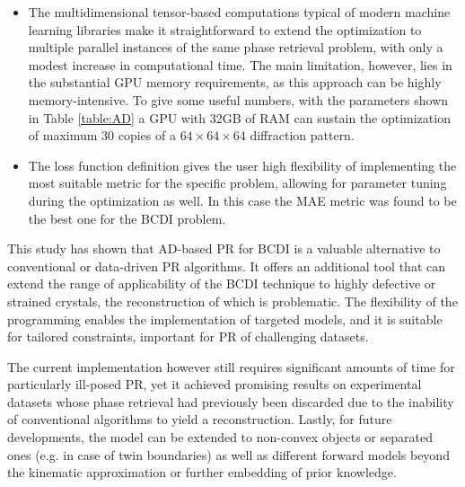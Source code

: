 \begin{itemize}
  \item The multidimensional tensor-based computations typical of modern machine learning libraries make it straightforward 
  to extend the optimization to multiple parallel instances of the same phase retrieval problem, with only a modest 
  increase in computational time. The main limitation, however, lies in the substantial GPU memory requirements, as 
  this approach can be highly memory-intensive. To give some useful numbers, with the parameters shown in Table \ref{table:AD} 
  a GPU with 32GB of RAM can sustain the optimization of maximum 30 copies of a $64\times 64\times 64$ diffraction pattern. 

  \item The loss function definition gives the user high flexibility of implementing the most suitable metric for the 
  specific problem, allowing for parameter tuning during the optimization as well. In this case the MAE metric was found to be the 
  best one for the BCDI problem.  
  
\end{itemize}

This study has shown that AD-based PR for BCDI is a valuable alternative to conventional or data-driven PR algorithms. 
It offers an additional tool that can extend the range of applicability of the BCDI technique to highly defective or strained 
crystals, the reconstruction of which is problematic. The flexibility of the programming enables the implementation of 
targeted models, and it is suitable for tailored constraints, important for PR of challenging datasets. 

The current implementation however still requires significant amounts of time for particularly ill-posed PR, yet it 
achieved promising results on experimental datasets whose phase retrieval had previously been discarded due to the 
inability of conventional algorithms to yield a reconstruction. Lastly, for future developments, the model can be 
extended to non-convex objects or separated ones (e.g. in case of twin boundaries) as well as different forward models 
beyond the kinematic approximation or further embedding of prior knowledge. 
